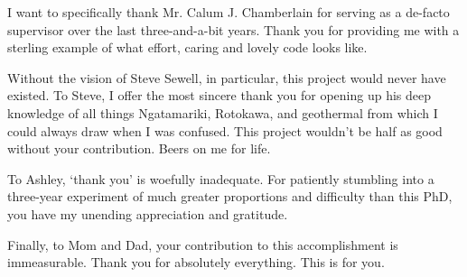 I want to specifically thank Mr. Calum J. Chamberlain for serving as a de-facto supervisor over the last three-and-a-bit years. Thank you for providing me with a sterling example of what effort, caring and lovely code looks like.

Without the vision of Steve Sewell, in particular, this project would never have existed. To Steve, I offer the most sincere thank you for opening up his deep knowledge of all things Ngatamariki, Rotokawa, and geothermal from which I could always draw when I was confused. This project wouldn't be half as good without your contribution. Beers on me for life.

To Ashley, `thank you' is woefully inadequate. For patiently stumbling into a three-year experiment of much greater proportions and difficulty than this PhD, you have my unending appreciation and gratitude.

Finally, to Mom and Dad, your contribution to this accomplishment is immeasurable. Thank you for absolutely everything. This is for you.